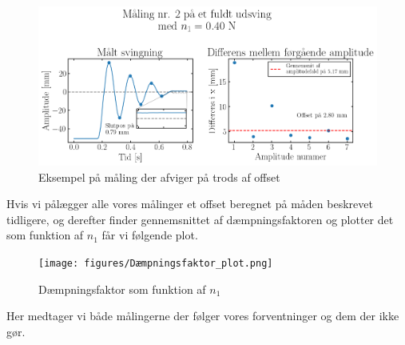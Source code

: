 \begin{figure}[htbp]
    \centering
    \includegraphics[width=0.8\linewidth,origin=c]{figures/n41.2-maks2.png}
    \caption{Eksempel på måling der afviger på trods af offset}
    \label{fig:dårlig_offset_graf}
\end{figure}

\noindent
Hvis vi pålægger alle vores målinger et offset beregnet på måden beskrevet tidligere, 
og derefter finder gennemsnittet af dæmpningsfaktoren og plotter det som funktion af $n_1$ får vi følgende plot.

\newpage

\begin{figure}[h]
    \centering
    \texttt{[image: figures/Dæmpningsfaktor\_plot.png]}
    \caption{Dæmpningsfaktor som funktion af $n_1$}
    \label{fig:dæmpningsfaktor}
\end{figure}

\noindent
Her medtager vi både målingerne der følger vores forventninger og dem der ikke gør. 
